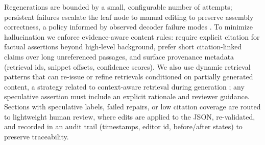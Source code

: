 Regenerations are bounded by a small, configurable number of attempts; persistent failures escalate the leaf node to manual editing to preserve assembly correctness, a policy informed by observed decoder failure modes \cite{web_wu_2025_constrained_auto_regressive_decoding_constrains_}.
To minimize hallucination we enforce evidence-aware content rules: require explicit citation for factual assertions beyond high-level background, prefer short citation-linked claims over long unreferenced passages, and surface provenance metadata (retrieval ids, snippet offsets, confidence scores).
We also use dynamic retrieval patterns that can re-issue or refine retrievals conditioned on partially generated content, a strategy related to context-aware retrieval during generation \cite{web_qi_2025_ar_rag_autoregressive_retrieval_augmentation_for}; any speculative assertion must include an explicit rationale and reviewer guidance.
Sections with speculative labels, failed repairs, or low citation coverage are routed to lightweight human review, where edits are applied to the JSON, re-validated, and recorded in an audit trail (timestamps, editor id, before/after states) to preserve traceability.